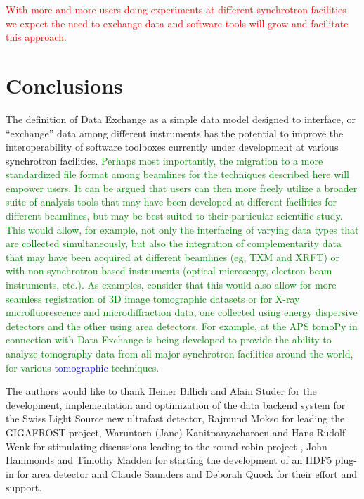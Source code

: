\documentclass[pdf]{iucr}              %
\begin{document}
\textcolor{red}{With more and more users doing experiments at different synchrotron facilities we expect the need to exchange data and software tools will grow and facilitate this approach.}
 

\section{Conclusions}

The definition of Data Exchange as a simple data model designed to interface, or ``exchange'' data among different instruments has the potential to improve the interoperability of software toolboxes currently under development at various synchrotron facilities. \textcolor{green}{Perhaps most importantly, the migration to a more standardized file format among beamlines for the techniques described here will empower users. It can be argued that users can then more freely utilize a broader suite of analysis tools that may have been developed at different facilities for different beamlines, but may be best suited to their particular scientific study. This would allow, for example, not only the interfacing of varying data types that are collected simultaneously, but also the integration of complementarity data that may have been acquired at different beamlines (eg, TXM and XRFT) or with non-synchrotron based instruments (optical microscopy, electron beam instruments, etc.). As examples, consider that this would also allow for more seamless registration of 3D image tomographic datasets or for X-ray microfluorescence and microdiffraction data, one collected using energy dispersive detectors and the other using area detectors. For example, at the APS tomoPy \cite{python_cpp} in connection with Data Exchange is being developed to provide the ability to analyze tomography data from all major synchrotron facilities around the world, for various  \textcolor{blue}{tomographic } techniques.} 







The authors would like to thank Heiner Billich and Alain Studer for the development, implementation and optimization of the data backend system for the Swiss Light Source new ultrafast detector, Rajmund Mokso for leading the GIGAFROST project, Waruntorn (Jane) Kanitpanyacharoen and Hans-Rudolf Wenk for stimulating discussions leading to the round-robin project \cite{Kanitpanyacharoen}, John Hammonds and Timothy Madden for starting the development of an HDF5 plug-in for area detector  and Claude Saunders and Deborah Quock for their effort and support.
\end{document}
